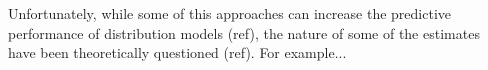 \documentclass[11pt, a4paper]{article}
\begin{document}


Unfortunately, while some of this approaches can increase the predictive performance of distribution models (ref), the nature of some of the estimates have been theoretically questioned (ref). For example...

%
\end{document}
